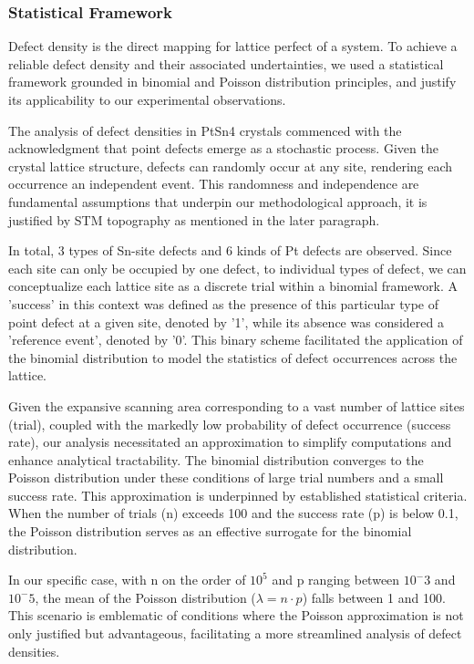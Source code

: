 \subsubsection{Statistical Framework}
Defect density is the direct mapping for lattice perfect of a system. To achieve a reliable defect density and their associated undertainties, we used a statistical framework grounded in binomial and Poisson distribution principles, and justify its applicability to our experimental observations.
\par The analysis of defect densities in PtSn4 crystals commenced with the acknowledgment that point defects emerge as a stochastic process. Given the crystal lattice structure, defects can randomly occur at any site, rendering each occurrence an independent event. This randomness and independence are fundamental assumptions that underpin our methodological approach, it is justified by STM topography as mentioned in the later paragraph.  
\par In total, 3 types of Sn-site defects and 6 kinds of Pt defects are observed. Since each site can only be occupied by one defect, to individual types of defect, we can conceptualize each lattice site as a discrete trial within a binomial framework. A 'success' in this context was defined as the presence of this particular type of point defect at a given site, denoted by '1', while its absence was considered a 'reference event', denoted by '0'. This binary scheme facilitated the application of the binomial distribution to model the statistics of defect occurrences across the lattice.
\par Given the expansive scanning area corresponding to a vast number of lattice sites (trial), coupled with the markedly low probability of defect occurrence (success rate), our analysis necessitated an approximation to simplify computations and enhance analytical tractability. The 
binomial distribution converges to the Poisson distribution under these conditions of large trial numbers and a small success rate. This approximation is underpinned by established statistical criteria. When the number of trials (n) exceeds 100 and the success rate (p) is below 0.1, the Poisson distribution serves as an effective surrogate for the binomial distribution. 
\par In our specific case, with n on the order of $10^5$ and p ranging between $10^-3$ and $10^-5$, the mean of the Poisson distribution ($\lambda=n\cdot p$) falls between 1 and 100. This scenario is emblematic of conditions where the Poisson approximation is not only justified but advantageous, facilitating a more streamlined analysis of defect densities.
